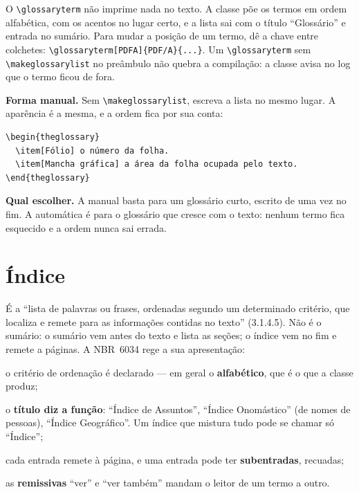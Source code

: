 \documentclass[dsc]{ufrj}
\begin{document}
  O \verb|\glossaryterm| não imprime nada no texto. A classe põe os termos em
  ordem alfabética, com os acentos no lugar certo, e a lista sai com o título
  ``Glossário'' e entrada no sumário. Para mudar a posição de um termo, dê a
  chave entre colchetes: \verb|\glossaryterm[PDFA]{PDF/A}{...}|. Um
  \verb|\glossaryterm| sem \verb|\makeglossarylist| no preâmbulo não quebra a
  compilação: a classe avisa no log que o termo ficou de fora.

  \textbf{Forma manual.} Sem \verb|\makeglossarylist|, escreva a lista no mesmo
  lugar. A aparência é a mesma, e a ordem fica por sua conta:

\begin{verbatim}
\begin{theglossary}
  \item[Fólio] o número da folha.
  \item[Mancha gráfica] a área da folha ocupada pelo texto.
\end{theglossary}
\end{verbatim}

  \textbf{Qual escolher.} A manual basta para um glossário curto, escrito de uma
  vez no fim. A automática é para o glossário que cresce com o texto: nenhum
  termo fica esquecido e a ordem nunca sai errada.

  \section{Índice}

  É a ``lista de palavras ou frases, ordenadas segundo um determinado critério,
  que localiza e remete para as informações contidas no texto'' (3.1.4.5). Não
  é o sumário: o sumário vem antes do texto e lista as seções; o índice vem no
  fim e remete a páginas. A \mbox{NBR~6034} rege a sua apresentação:
  \begin{alineas}
    \item o critério de ordenação é declarado --- em geral o
      \textbf{alfabético}, que é o que a classe produz;
    \item o \textbf{título diz a função}: ``Índice de Assuntos'', ``Índice
      Onomástico'' (de nomes de pessoas), ``Índice Geográfico''. Um índice
      que mistura tudo pode se chamar só ``Índice'';
    \item cada entrada remete à página, e uma entrada pode ter
      \textbf{subentradas}, recuadas;
    \item as \textbf{remissivas} ``ver'' e ``ver também'' mandam o leitor de
      um termo a outro.
  \end{alineas}
\end{document}
